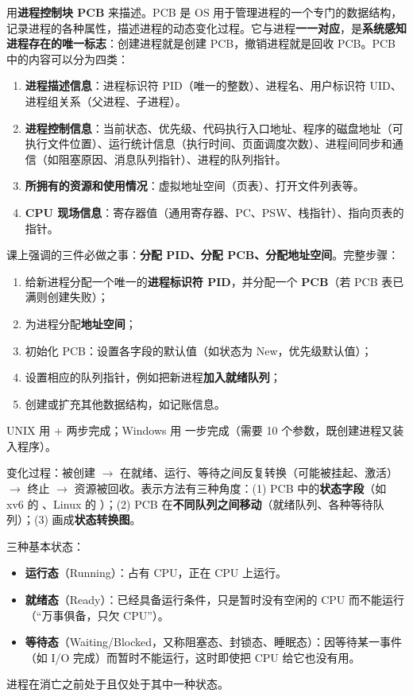 用\textbf{进程控制块 PCB} 来描述。PCB 是 OS 用于管理进程的一个专门的数据结构，记录进程的各种属性，描述进程的动态变化过程。它与进程\textbf{一一对应}，是\textbf{系统感知进程存在的唯一标志}：创建进程就是创建 PCB，撤销进程就是回收 PCB。PCB 中的内容可以分为四类：
\begin{enumerate}
    \item \textbf{进程描述信息}：进程标识符 PID（唯一的整数）、进程名、用户标识符 UID、进程组关系（父进程、子进程）。
    \item \textbf{进程控制信息}：当前状态、优先级、代码执行入口地址、程序的磁盘地址（可执行文件位置）、运行统计信息（执行时间、页面调度次数）、进程间同步和通信（如阻塞原因、消息队列指针）、进程的队列指针。
    \item \textbf{所拥有的资源和使用情况}：虚拟地址空间（页表）、打开文件列表等。
    \item \textbf{CPU 现场信息}：寄存器值（通用寄存器、PC、PSW、栈指针）、指向页表的指针。
\end{enumerate}

\bk 课上强调的三件必做之事：\textbf{分配 PID、分配 PCB、分配地址空间}。完整步骤：
\begin{enumerate}
    \item 给新进程分配一个唯一的\textbf{进程标识符 PID}，并分配一个 \textbf{PCB}（若 PCB 表已满则创建失败）；
    \item 为进程分配\textbf{地址空间}；
    \item 初始化 PCB：设置各字段的默认值（如状态为 New，优先级默认值）；
    \item 设置相应的队列指针，例如把新进程\textbf{加入就绪队列}；
    \item 创建或扩充其他数据结构，如记账信息。
\end{enumerate}
UNIX 用  +  两步完成；Windows 用  一步完成（需要 10 个参数，既创建进程又装入程序）。

变化过程：被创建 $\to$ 在就绪、运行、等待之间反复转换（可能被挂起、激活）$\to$ 终止 $\to$ 资源被回收。表示方法有三种角度：(1) PCB 中的\textbf{状态字段}（如 xv6 的 、Linux 的 ）；(2) PCB 在\textbf{不同队列之间移动}（就绪队列、各种等待队列）；(3) 画成\textbf{状态转换图}。

三种基本状态：
\begin{itemize}
    \item \textbf{运行态}（Running）：占有 CPU，正在 CPU 上运行。
    \item \textbf{就绪态}（Ready）：已经具备运行条件，只是暂时没有空闲的 CPU 而不能运行（“万事俱备，只欠 CPU”）。
    \item \textbf{等待态}（Waiting/Blocked，又称阻塞态、封锁态、睡眠态）：因等待某一事件（如 I/O 完成）而暂时不能运行，这时即使把 CPU 给它也没有用。
\end{itemize}
进程在消亡之前处于且仅处于其中一种状态。


